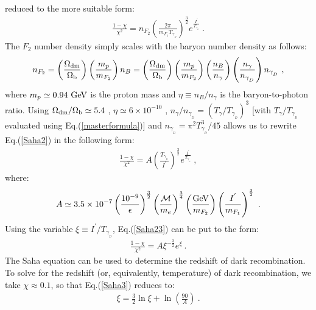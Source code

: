 \documentclass[12pt]{article}
\begin{document}
reduced to the more suitable form:
%
\begin{eqnarray}
\frac{1 - \chi}{\chi ^2} = n _{F_2}\left ( \frac{2\pi}{m _{F_1}T
_{\gamma _{_D}}} \right ) ^{\frac{3}{2}} e ^{\frac{I ^{'}}{T _{\gamma
_{_D}}}} \ .
\label{Saha2}
\end{eqnarray}
%
The $F _2$ number density simply scales with the baryon number density
as follows:
%
\begin{eqnarray}
n _{F_2} = \left ( \frac{\Omega _{\text{dm}}}{\Omega _{\text b}} \right
) \left ( \frac{m _p}{m _{F_2}} \right ) n _B = \left ( \frac{\Omega
_{\text{dm}}}{\Omega _{\text b}} \right ) \left ( \frac{m _p}{m _{F_2}}
\right ) \left ( \frac{n _B}{n _{\gamma}} \right ) \left ( \frac{n
_{\gamma}}{n _{\gamma _{_D}}} \right ) n _{\gamma _{_D}} \ ,
\label{nf2scale}
\end{eqnarray}
%
where $m _p \simeq 0.94 \ {\rm GeV}$ is the proton mass and $\eta \equiv
n _B/n _{\gamma}$ is the baryon-to-photon ratio. Using $\Omega
_{\text{dm}}/\Omega _{\text b} \simeq 5.4$ \cite{plax}, $\eta \simeq 6
\times 10 ^{-10}$ \cite{pdg}, $n _{\gamma}/n _{\gamma _{_D}} = \left (T
_{\gamma}/T _{\gamma _{_D}} \right ) ^3$ [with $T _{\gamma}/T _{\gamma
_{_D}}$ evaluated using Eq.(\ref{masterformula})] and $n _{\gamma _{_D}}
= \pi ^2T _{\gamma _{_D}} ^3/45$ allows us to rewrite Eq.(\ref{Saha2})
in the following form:
%
\begin{eqnarray}
\frac{1 - \chi}{\chi ^2} = A \left ( \frac{T _{\gamma _{_D}}}{I ^{'}}
\right ) ^{\frac{3}{2}} e ^{\frac{I ^{'}}{T _{\gamma _{_D}}}} \ ,
\label{Saha23}
\end{eqnarray}
%
where:
%
\begin{eqnarray}
A \simeq 3.5 \times 10 ^{-7} \left ( \frac{10 ^{-9}}{\epsilon} \right )
^{\frac{3}{2}} \left ( \frac{{\cal M}}{m _e} \right ) ^{\frac{3}{4}}
\left ( \frac{\rm GeV}{m _{F_2}} \right ) \left ( \frac{I ^{'}}{m
_{F_1}} \right ) ^{\frac{3}{2}} \ .
\end{eqnarray}
%
Using the variable $\xi \equiv I ^{'}/T _{\gamma _{_D}}$,
Eq.(\ref{Saha23}) can be put to the form:
%
\begin{eqnarray}
\frac{1 - \chi}{\chi ^2} = A \xi ^{-\frac{3}{2}} e ^{\xi} \ .
\label{Saha3}
\end{eqnarray}
%
The Saha equation can be used to determine the redshift of dark
recombination. To solve for the redshift (or, equivalently, temperature)
of dark recombination, we take $\chi \approx 0.1$, so that
Eq.(\ref{Saha3}) reduces to:
%
\begin{eqnarray}
\xi = \frac{3}{2} \ln \xi + \ln \left ( \frac{90}{A} \right ) \ .
\label{sahafinal}
\end{eqnarray}
\end{document}
